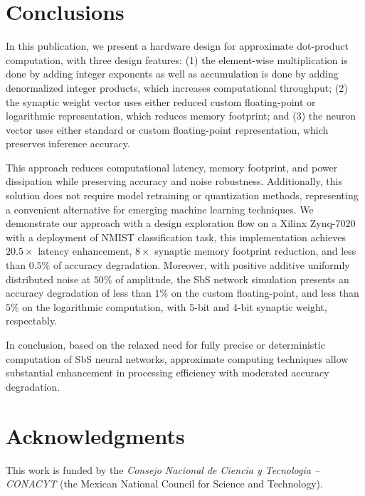 \section{Conclusions}
\label{sec:conclusions}

In this publication, we present a hardware design for approximate dot-product computation, with three design features: (1) the element-wise multiplication is done by adding integer exponents as well as accumulation is done by adding denormalized integer products, which increases computational throughput; (2) the synaptic weight vector uses either reduced custom floating-point or logarithmic representation, which reduces memory footprint; and (3) the neuron vector uses either standard or custom floating-point representation, which preserves inference accuracy.

This approach reduces computational latency, memory footprint, and power dissipation while preserving accuracy and noise robustness. Additionally, this solution does not require model retraining or quantization methods, representing a convenient alternative for emerging machine learning techniques. We demonstrate our approach with a design exploration flow on a Xilinx Zynq-7020 with a deployment of NMIST classification task, this implementation achieves $20.5\times$ latency enhancement, $8\times$ synaptic memory footprint reduction, and less than $0.5\%$ of accuracy degradation. Moreover, with positive additive uniformly distributed noise at $50\%$ of amplitude, the SbS network simulation presents an accuracy degradation of less than $1\%$ on the custom floating-point, and less than $5\%$ on the logarithmic computation, with 5-bit and 4-bit synaptic weight, respectably.

In conclusion, based on the relaxed need for fully precise or deterministic computation of SbS neural networks, approximate computing techniques allow substantial enhancement in processing efficiency with moderated accuracy degradation.

\section * {Acknowledgments}\label{sec:Ack}
This work is funded by the \textit{Consejo Nacional de Ciencia y Tecnologia -- CONACYT} (the Mexican National Council for Science and Technology).

